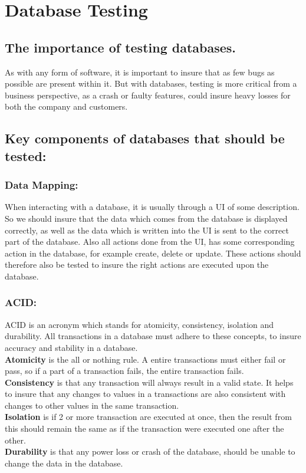 \section{Database Testing}

\subsection{The importance of testing databases.}

As with any form of software, it is important to insure that as few bugs as possible are present within it. But with databases, testing is more critical from a business perspective, as a crash or faulty features, could insure heavy losses for both the company and customers.

\subsection{Key components of databases that should be tested:}

\subsubsection{Data Mapping:}

When interacting with a database, it is usually through a UI of some description. So we should insure that the data which comes from the database is displayed correctly, as well as the data which is written into the UI is sent to the correct part of the database. Also all actions done from the UI, has some corresponding action in the database, for example create, delete or update. These actions should therefore also be tested to insure the right actions are executed upon the database.

\subsubsection{ACID:}
ACID is an acronym which stands for atomicity, consistency, isolation and durability. All transactions in a database must adhere to these concepts, to insure accuracy and stability in a database. \cite{ACID} \\
\textbf{Atomicity} is the all or nothing rule. A entire transactions must either fail or pass, so if a part of a transaction fails, the entire transaction fails. \\
\textbf{Consistency} is that any transaction will always result in a valid state. It helps to insure that any changes to values in a transactions are also consistent with changes to other values in the same transaction. \\
\textbf{Isolation }is if 2 or more transaction are executed at once, then the result from this should remain the same as if the transaction were executed one after the other. \\
\textbf{Durability} is that any power loss or crash of the database, should be unable to change the data in the database.

